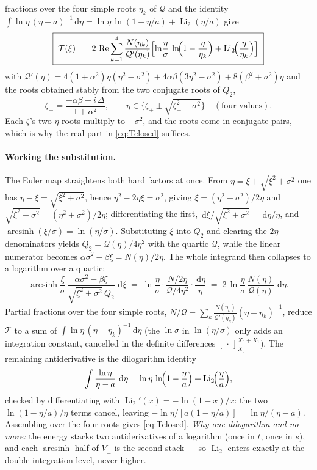 \documentclass[11pt]{article}
\newcommand{\Li}{\operatorname{Li}_2}
\newcommand{\asinh}{\operatorname{arcsinh}}
\newcommand{\dd}{\,\mathrm{d}}
\begin{document}
fractions over the four simple roots $\eta_k$ of $\mathcal Q$ and the identity
$\int \ln\eta\,(\eta-a)^{-1}\dd\eta = \ln\eta\,\ln(1-\eta/a)+\Li(\eta/a)$ give
\begin{equation}
  \boxed{\;
  \mathcal T(\xi) \;=\; 2\,\operatorname{Re}\sum_{k=1}^{4}
  \frac{N(\eta_k)}{\mathcal Q'(\eta_k)}
  \Bigl[\ln\!\frac{\eta}{\sigma}\,\ln\!\Bigl(1-\frac{\eta}{\eta_k}\Bigr)
        +\Li\!\Bigl(\frac{\eta}{\eta_k}\Bigr)\Bigr] \;}
  \label{eq:Tclosed}
\end{equation}
with $\mathcal Q'(\eta)=4(1{+}\alpha^2)\eta(\eta^2{-}\sigma^2)
+4\alpha\beta(3\eta^2{-}\sigma^2)+8(\beta^2{+}\sigma^2)\eta$ and the roots obtained
stably from the two conjugate roots of $Q_2$,
\begin{equation}
  \zeta_\pm=\frac{-\alpha\beta\pm i\,\Delta}{1+\alpha^2},
  \qquad
  \eta \in \bigl\{\zeta_\pm \pm \sqrt{\zeta_\pm^2+\sigma^2}\bigr\}
  \quad(\text{four values}).
  \label{eq:roots}
\end{equation}
Each $\zeta$'s two $\eta$-roots multiply to $-\sigma^2$, and the roots come in
conjugate pairs, which is why the real part in \eqref{eq:Tclosed} suffices.

\paragraph{Working the substitution.}  The Euler map straightens both hard factors at
once.  From $\eta=\xi+\sqrt{\xi^2+\sigma^2}$ one has
$\eta-\xi=\sqrt{\xi^2+\sigma^2}$, hence $\eta^2-2\eta\xi=\sigma^2$, giving
$\xi=(\eta^2-\sigma^2)/2\eta$ and $\sqrt{\xi^2+\sigma^2}=(\eta^2+\sigma^2)/2\eta$;
differentiating the first, $\dd\xi/\sqrt{\xi^2+\sigma^2}=\dd\eta/\eta$, and
$\asinh(\xi/\sigma)=\ln(\eta/\sigma)$.  Substituting $\xi$ into $Q_2$ and clearing the
$2\eta$ denominators yields $Q_2=\mathcal Q(\eta)/4\eta^2$ with the quartic
$\mathcal Q$, while the linear numerator becomes $\alpha\sigma^2-\beta\xi=N(\eta)/2\eta$.
The whole integrand then collapses to a logarithm over a quartic:
\[
  \asinh\!\frac{\xi}{\sigma}\,
  \frac{\alpha\sigma^2-\beta\xi}{\sqrt{\xi^2+\sigma^2}\,Q_2}\,\dd\xi
  \;=\; \ln\!\frac{\eta}{\sigma}\cdot
        \frac{N/2\eta}{\mathcal Q/4\eta^2}\cdot\frac{\dd\eta}{\eta}
  \;=\; 2\,\ln\!\frac{\eta}{\sigma}\,\frac{N(\eta)}{\mathcal Q(\eta)}\,\dd\eta .
\]
Partial fractions over the four simple roots,
$N/\mathcal Q=\sum_k \tfrac{N(\eta_k)}{\mathcal Q'(\eta_k)}(\eta-\eta_k)^{-1}$, reduce
$\mathcal T$ to a sum of $\int\ln\eta\,(\eta-\eta_k)^{-1}\dd\eta$ (the $\ln\sigma$ in
$\ln(\eta/\sigma)$ only adds an integration constant, cancelled in the definite
differences $[\,\cdot\,]_{X_0}^{X_0+X_1}$).  The remaining antiderivative is the
dilogarithm identity
\[
  \int\frac{\ln\eta}{\eta-a}\,\dd\eta
  = \ln\eta\,\ln\!\Bigl(1-\frac{\eta}{a}\Bigr)+\Li\!\Bigl(\frac{\eta}{a}\Bigr),
\]
checked by differentiating with $\Li'(x)=-\ln(1-x)/x$: the two $\ln(1-\eta/a)/\eta$
terms cancel, leaving $-\ln\eta/[a(1-\eta/a)]=\ln\eta/(\eta-a)$.  Assembling over the
four roots gives \eqref{eq:Tclosed}.  \emph{Why one dilogarithm and no more:} the
energy stacks two antiderivatives of a logarithm (once in $t$, once in $s$), and each
$\asinh$ half of $V_\pm$ is the second stack --- so $\Li$ enters exactly at the
double-integration level, never higher.
\end{document}
